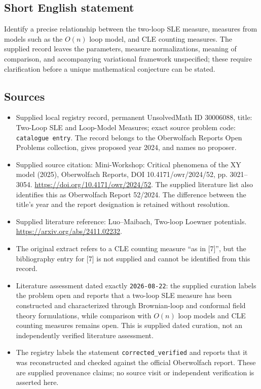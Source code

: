 \documentclass[11pt]{article}
\begin{document}
\subsection{Short English statement}
Identify a precise relationship between the two-loop SLE measure, measures from models such as the \(O(n)\) loop model, and CLE counting measures. The supplied record leaves the parameters, measure normalizations, meaning of comparison, and accompanying variational framework unspecified; these require clarification before a unique mathematical conjecture can be stated.
\subsection{Sources}
\begin{itemize}
\item Supplied local registry record, permanent UnsolvedMath ID \(30006088\), title: Two-Loop SLE and Loop-Model Measures; exact source problem code: \texttt{catalogue entry}. The record belongs to the Oberwolfach Reports Open Problems collection, gives proposed year 2024, and names no proposer.
\item Supplied source citation: Mini-Workshop: Critical phenomena of the XY model (2025), Oberwolfach Reports, DOI 10.4171/owr/2024/52, pp. 3021--3054. \url{https://doi.org/10.4171/owr/2024/52}. The supplied literature list also identifies this as Oberwolfach Report 52/2024. The difference between the title's year and the report designation is retained without resolution.
\item Supplied literature reference: Luo--Maibach, Two-loop Loewner potentials. \url{https://arxiv.org/abs/2411.02232}.
\item The original extract refers to a CLE counting measure ``as in [7]'', but the bibliography entry for [7] is not supplied and cannot be identified from this record.
\item Literature assessment dated exactly \texttt{2026-08-22}: the supplied curation labels the problem open and reports that a two-loop SLE measure has been constructed and characterized through Brownian-loop and conformal field theory formulations, while comparison with \(O(n)\) loop models and CLE counting measures remains open. This is supplied dated curation, not an independently verified literature assessment.
\item The registry labels the statement \texttt{corrected\_verified} and reports that it was reconstructed and checked against the official Oberwolfach report. These are supplied provenance claims; no source visit or independent verification is asserted here.
\end{itemize}
\end{document}
